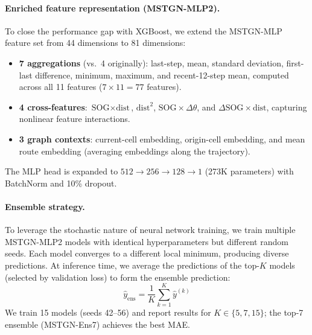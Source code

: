 \documentclass[conference]{IEEEtran}
\begin{document}
\paragraph{Enriched feature representation (MSTGN-MLP2).}
To close the performance gap with XGBoost, we extend the MSTGN-MLP feature set from 44 dimensions to 81 dimensions:
\begin{itemize}
    \item \textbf{7 aggregations} (vs.\ 4 originally): last-step, mean, standard deviation, first-last difference, minimum, maximum, and recent-12-step mean, computed across all 11 features ($7 \times 11 = 77$ features).
    \item \textbf{4 cross-features}: $\text{SOG} \times \text{dist}$, $\text{dist}^2$, $\text{SOG} \times \Delta\theta$, and $\Delta\text{SOG} \times \text{dist}$, capturing nonlinear feature interactions.
    \item \textbf{3 graph contexts}: current-cell embedding, origin-cell embedding, and mean route embedding (averaging embeddings along the trajectory).
\end{itemize}
The MLP head is expanded to $512 \to 256 \to 128 \to 1$ (273K parameters) with BatchNorm and 10\% dropout.

\paragraph{Ensemble strategy.}
To leverage the stochastic nature of neural network training, we train multiple MSTGN-MLP2 models with identical hyperparameters but different random seeds.
Each model converges to a different local minimum, producing diverse predictions.
At inference time, we average the predictions of the top-$K$ models (selected by validation loss) to form the ensemble prediction:
\begin{equation}
    \hat{y}_{\text{ens}} = \frac{1}{K} \sum_{k=1}^{K} \hat{y}^{(k)}
\end{equation}
We train 15 models (seeds 42--56) and report results for $K \in \{5, 7, 15\}$; the top-7 ensemble (MSTGN-Ens7) achieves the best MAE.
\end{document}
